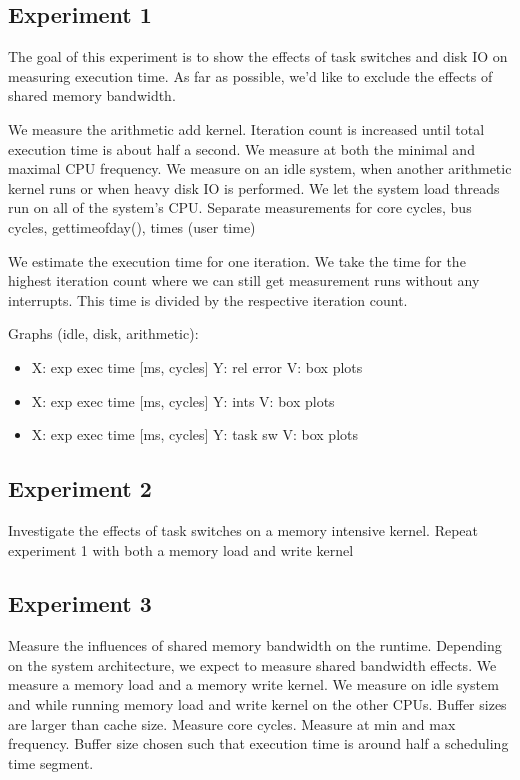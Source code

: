\documentclass[a4paper,12pt]{article}
\begin{document}
\subsection{Experiment 1}
The goal of this experiment is to show the effects of task switches and disk IO on measuring execution time. As far as possible, we'd like to exclude the effects of shared memory bandwidth. 

We measure the arithmetic add kernel. Iteration count is increased until total execution time is about half a second. We measure at both the minimal and maximal CPU frequency. We measure on an idle system, when another arithmetic kernel runs or when heavy disk IO is performed. We let the system load threads run on all of the system's CPU. Separate measurements for core cycles, bus cycles, gettimeofday(), times (user time)

We estimate the execution time for one iteration. We take the time for the highest iteration count where we can still get measurement runs without any interrupts. This time is divided by the respective iteration count.

Graphs (idle, disk, arithmetic): 

\begin{itemize}
\item X: exp exec time [ms, cycles] Y: rel error V: box plots
\item X: exp exec time [ms, cycles] Y: ints V: box plots
\item X: exp exec time [ms, cycles] Y: task sw V: box plots
\end{itemize}

\subsection{Experiment 2}
Investigate the effects of task switches on a memory intensive kernel. Repeat experiment 1 with both a memory load and write kernel

\subsection{Experiment 3}
Measure the influences of shared memory bandwidth on the runtime. Depending on the system architecture, we expect to measure shared bandwidth effects. We measure a memory load and a memory write kernel. We measure on idle system and while running memory load and write kernel on the other CPUs. Buffer sizes are larger than cache size. Measure core cycles. Measure at min and max frequency. Buffer size chosen such that execution time is around half a scheduling time segment.
\end{document}
